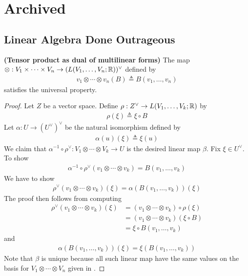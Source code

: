 \documentclass{report}
\begin{document}
\chapter{Archived}
\section{Linear Algebra Done Outrageous}
\begin{theorem}
\textbf{(Tensor product as dual of multilinear forms)} The map $\otimes  :V_1 \times \cdots \times V_n \rightarrow (L(V_1,\dots ,V_n;\mathbb{R}))^{\vee}$ defined by 
\begin{align*}
v_1 \otimes  \cdots \otimes  v_n (B)\triangleq B(v_1,\dots ,v_n)
\end{align*}
satisfies the universal property. 
\end{theorem}
\begin{proof}
Let $Z$ be a vector space. Define $\rho: Z^\vee \rightarrow L(V_1,\dots ,V_k;\mathbb{R})$ by 
\begin{align*}
\rho (\xi)\triangleq \xi \circ B
\end{align*}
Let $\alpha :U\rightarrow (U^{\vee})^{\vee}$ be the natural isomorphism defined by 
\begin{align*}
\alpha (u)(\xi)\triangleq \xi(u)
\end{align*}
We claim that $\alpha ^{-1}\circ \rho^{\vee}:V_1 \otimes \cdots \otimes  V_k\rightarrow U$ is the desired linear map $\beta $. Fix $\xi \in U^{\vee}$. To show 
\begin{align*}
\alpha ^{-1}\circ \rho ^{\vee}(v_1\otimes  \cdots \otimes  v_k)=B(v_1,\dots ,v_k)
\end{align*}
We have to show 
\begin{align*}
\rho^{\vee}(v_1\otimes  \cdots \otimes  v_k)(\xi)= \alpha (B(v_1,\dots ,v_k)) (\xi)
\end{align*}
The proof then follows from computing  
\begin{align*}
\rho^{\vee}(v_1\otimes  \cdots \otimes  v_k)(\xi)&= (v_1\otimes  \cdots \otimes  v_k) \circ \rho (\xi)\\
&=(v_1\otimes  \cdots \otimes  v_k)(\xi \circ B)\\
&=\xi \circ B(v_1,\dots ,v_k)
\end{align*}
and 
\begin{align*}
\alpha (B(v_1,\dots ,v_k))(\xi)= \xi(B(v_1,\dots ,v_k))
\end{align*}
Note that $\beta $ is unique because all such linear map have the same values on the basis for $V_1\otimes  \cdots \otimes  V_n$ given in . 
\end{proof}
\end{document}
